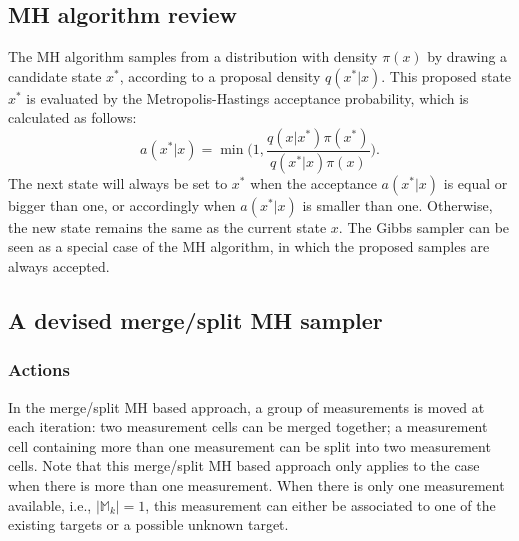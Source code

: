 \subsection{MH algorithm review}
The MH algorithm samples from a distribution with density $\pi(x)$ by drawing a candidate state $x^*$, according to a proposal density $q(x^*|x)$. This proposed state $x^*$ is evaluated by the Metropolis-Hastings acceptance probability, which is calculated as follows:
\begin{equation}
    a(x^*|x) = \min\bigg(1,\frac{q(x|x^*)\pi(x^*)}{q(x^*|x)\pi(x)}\bigg).
    \label{eq:mhprob}
\end{equation}
The next state will always be set to $x^*$ when the acceptance $a(x^*|x)$ is equal or bigger than one, or accordingly when $a(x^*|x)$ is smaller than one. Otherwise, the new state remains the same as the current state $x$. The Gibbs sampler can be seen as a special case of the MH algorithm, in which the proposed samples are always accepted. 

\subsection{A devised merge/split MH sampler}

\subsubsection{Actions}

In the merge/split MH based approach, a group of measurements is moved at each iteration: two measurement cells can be merged together; a measurement cell containing more than one measurement can be split into two measurement cells. Note that this merge/split MH based approach only applies to the case when there is more than one measurement. When there is only one measurement available, i.e., $|\mathbb{M}_k|=1$, this measurement can either be associated to one of the existing targets or a possible unknown target. 

